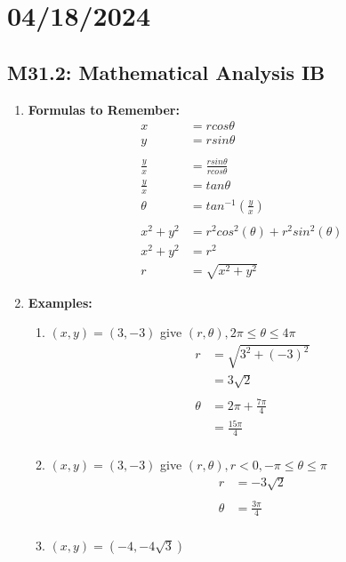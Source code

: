 \documentclass{article}
\begin{document}
\section*{04/18/2024}
\subsection*{M31.2: Mathematical Analysis IB}
\begin{enumerate}
    \item \textbf{Formulas to Remember:}
    \begin{align*}
        x&=rcos\theta \\
        y&=rsin\theta \\
        \\
        \frac{y}{x}&=\frac{rsin\theta}{rcos\theta} \\
        \frac{y}{x}&=tan\theta \\
        \theta&=tan^{-1}(\frac{y}{x}) \\
        \\
        x^2+y^2&=r^2cos^2(\theta)+r^2sin^2(\theta) \\
        x^2+y^2&=r^2 \\
        r&=\sqrt{x^2+y^2}
    \end{align*}
    \item \textbf{Examples:}
    \begin{enumerate}
        \item \textbf{$(x,y)=(3,-3)$}
        give $(r,\theta), 2\pi\le\theta\le4\pi$ \\
        \begin{align*}
            r&=\sqrt{3^2+(-3)^2} \\
            &=3\sqrt{2} \\
            \\
            \theta&=2\pi+\frac{7\pi}{4} \\
            &=\frac{15\pi}{4} \\
        \end{align*}
        \item \textbf{$(x,y)=(3,-3)$}
        give $(r,\theta), r<0, -\pi\le\theta\le\pi$ \\
        \begin{align*}
            r&=-3\sqrt{2} \\
            \\
            \theta&=\frac{3\pi}{4} \\
        \end{align*}
        \item \textbf{$(x,y)=(-4,-4\sqrt{3})$}

\end{enumerate}
\end{enumerate}
\end{document}
